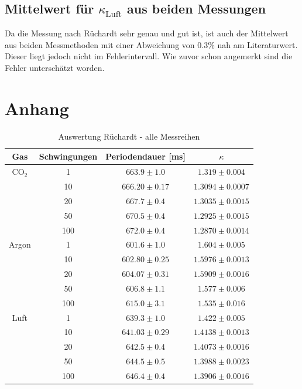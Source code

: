 \documentclass[12pt,a4paper,titlepage,headinclude,bibtotoc]{scrartcl}
\begin{document}
\subsection{Mittelwert für $\kappa_\text{Luft}$ aus beiden Messungen}
Da die Messung nach Rüchardt sehr genau und gut ist, ist auch der Mittelwert aus beiden Messmethoden mit einer Abweichung von $0.3\%$ nah am Literaturwert.
Dieser liegt jedoch nicht im Fehlerintervall.
Wie zuvor schon angemerkt sind die Fehler unterschätzt worden.

\section{Anhang}
\begin{table}[!htb]
	\centering
	\begin{tabular}{|c|c|c|c|}
		\hline
		Gas & Schwingungen & Periodendauer [ms] &$\kappa$\\
		\hline
		\hline
		CO$_2$
		& 1 & $663.9 \pm 1.0$ & $1.319 \pm 0.004$ \\
		& 10 & $666.20 \pm 0.17$ & $1.3094 \pm 0.0007$ \\
		& 20 & $667.7 \pm 0.4$ & $1.3035 \pm 0.0015$ \\
		& 50 & $670.5 \pm 0.4$ & $1.2925 \pm 0.0015$ \\
		& 100 & $672.0 \pm 0.4$ & $1.2870 \pm 0.0014$ \\
		\hline
		Argon
		& 1 & $601.6 \pm 1.0$ & $1.604 \pm 0.005$ \\
		& 10 & $602.80 \pm 0.25$ & $1.5976 \pm 0.0013$ \\
		& 20 & $604.07 \pm 0.31$ & $1.5909 \pm 0.0016$ \\
		& 50 & $606.8 \pm 1.1$ & $1.577 \pm 0.006$ \\
		& 100 & $615.0 \pm 3.1$ & $1.535 \pm 0.016$ \\
		\hline		
		Luft
		& 1 & $639.3 \pm 1.0$ & $1.422 \pm 0.005$ \\
		& 10 & $641.03 \pm 0.29$ & $1.4138 \pm 0.0013$ \\
		& 20 & $642.5 \pm 0.4$ & $1.4073 \pm 0.0016$ \\
		& 50 & $644.5 \pm 0.5$ & $1.3988 \pm 0.0023$ \\
		& 100 & $646.4 \pm 0.4$ & $1.3906 \pm 0.0016$ \\
		\hline
	\end{tabular}
	\caption{Auswertung Rüchardt - alle Messreihen}
	\label{tab:RuechardtGenauer}
\end{table}



\end{document}

